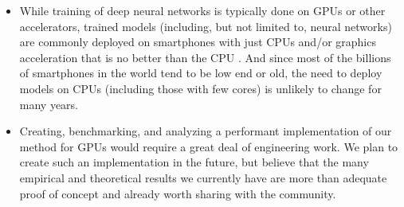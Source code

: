 \begin{itemize}
    \item While training of deep neural networks is typically done on GPUs or other accelerators, trained models (including, but not limited to, neural networks) are commonly deployed on smartphones with just CPUs and/or graphics acceleration that is no better than the CPU \cite{fbAtEdge}. And since most of the billions of smartphones in the world tend to be low end or old, the need to deploy models on CPUs (including those with few cores) is unlikely to change for many years.
    \item Creating, benchmarking, and analyzing a performant implementation of our method for GPUs would require a great deal of engineering work. We plan to create such an implementation in the future, but believe that the many empirical and theoretical results we currently have are more than adequate proof
    of concept and already worth sharing with the community. %

\end{itemize}
